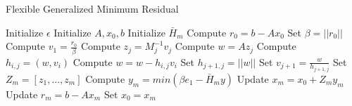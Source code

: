 \begin{algorithm}
    \caption{Flexible Generalized Minimum Residual}
    \begin{algorithmic}[1]
        \State Initialize $\epsilon$ 
        \State Initialize  $A, x_0, b$
        \State Initialize $\bar{H}_m$
            \State Compute $r_0 = b - Ax_0$
            \State Set $\beta = ||r_0||$
            \State Compute $v_1 = \frac{r_0}{\beta}$
             
                \State Compute $z_j = M^{-1}_jv_j$ 
                \State Compute $w = Az_j$
                    \State Compute $h_{i,j} = (w, v_i)$
                    \State Compute $w = w - h_{i,j}v_i$
                \EndFor
                \State Set $h_{j+1,j} = ||w||$
                \State Set $v_{j+1} = \frac{w}{h_{j+1,j}}$
            \EndFor
            \State Set $Z_m = [z_1, ..., z_m]$
            \State Compute $y_m = min(\beta e_1 - \bar{H}_m y)$ 
            \State Update $x_m = x_0 + Z_my_m$
            \State Update $r_m = b - Ax_m$
            \State Set $x_0 = x_m$
        \EndWhile
    \end{algorithmic}
    \label{alg:fgmres}
    \end{algorithm}
